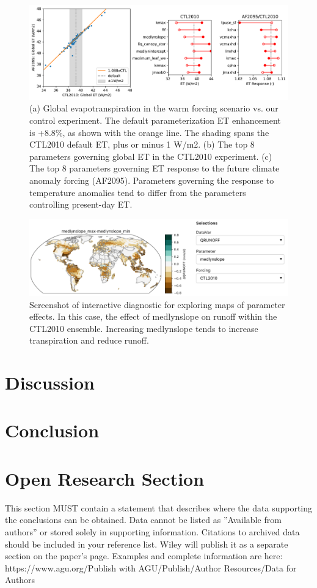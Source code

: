 \documentclass[draft]{agujournal2019}
\begin{document}
\begin{figure}[h]
\centering
\includegraphics[width=40pc]{../figs/ET_response.pdf}
\caption{(a) Global evapotranspiration in the warm forcing scenario vs. our control experiment. The default parameterization ET enhancement is +8.8\%, as shown with the orange line. The shading spans the CTL2010 default ET, plus or minus 1 W/m2.
(b) The top 8 parameters governing global ET in the CTL2010 experiment.
(c) The top 8 parameters governing ET response to the future climate anomaly forcing (AF2095).
Parameters governing the response to temperature anomalies tend to differ from the parameters controlling present-day ET.}
\label{fig:et}
\end{figure}


\begin{figure}[h]
\centering
\includegraphics[width=40pc]{../figs/deltmap_panel.pdf}
\caption{Screenshot of interactive diagnostic for exploring maps of parameter effects. In this case, the effect of medlynslope on runoff within the CTL2010 ensemble. Increasing medlynslope tends to increase transpiration and reduce runoff.}
\label{fig:panel}
\end{figure}

\section{Discussion}
\section{Conclusion}
\section*{Open Research Section}
This section MUST contain a statement that describes where the data supporting the conclusions can be obtained. Data cannot be listed as ''Available from authors'' or stored solely in supporting information. Citations to archived data should be included in your reference list. Wiley will publish it as a separate section on the paper’s page. Examples and complete information are here:
https://www.agu.org/Publish with AGU/Publish/Author Resources/Data for Authors
\end{document}
